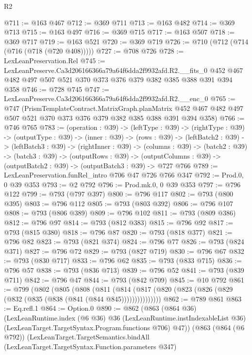 \begin{lexlean}{R2}
\begin{coremodule}
@711 := @163 @467
@712 := @369 @711
@713 := @163 @482
@714 := @369 @713
@715 := @163 @497
@716 := @369 @715
@717 := @163 @507
@718 := @369 @717
@719 := @163 @521
@720 := @369 @719
@726 := @710 (@712 (@714 (@716 (@718 (@720 @408)))))
@727 := @708 @726
@728 := LexLeanPreservation.Rel
@745 := LexLeanPreserve.Ca3d206166366a79a64f6dda2f9932afd.R2.__fits_0
    @452
    @467
    @482
    @497
    @507
    @521
    @370
    @373
    @376
    @379
    @382
    @385
    @388
    @391
    @394
    @358
@746 := @728 @745
@747 := LexLeanPreserve.Ca3d206166366a79a64f6dda2f9932afd.R2.__enc_0
@765 := @747
    (PrismTemplateContract.MatrixGraph.planMatrix
      @452
      @467
      @482
      @497
      @507
      @521
      @370
      @373
      @376
      @379
      @382
      @385
      @388
      @391
      @394
      @358)
@766 := @746 @765
@783 := (operation : @39) ->
  (leftType : @39) ->
  (rightType : @39) ->
  (outputType : @39) ->
  (inner : @39) ->
  (rows : @39) ->
  (leftBatch2 : @39) ->
  (leftBatch3 : @39) ->
  (rightInner : @39) ->
  (columns : @39) ->
  (batch2 : @39) ->
  (batch3 : @39) ->
  (outputRows : @39) ->
  (outputColumns : @39) -> (outputBatch2 : @39) -> (outputBatch3 : @39) -> @727 @766
@789 := LexLeanPreservation.funRel_intro @706 @47 @726 @766 @347
@792 := Prod.{0, 0} @39 @353
@793 := @2 @792
@796 := Prod.mk.{0, 0} @39 @353
@797 := @796 @122
@799 := @793 (@797 @397)
@800 := @796 @117
@802 := @793 (@800 @395)
@803 := @796 @112
@805 := @793 (@803 @392)
@806 := @796 @107
@808 := @793 (@806 @389)
@809 := @796 @102
@811 := @793 (@809 @386)
@812 := @796 @97
@814 := @793 (@812 @383)
@815 := @796 @92
@817 := @793 (@815 @380)
@818 := @796 @87
@820 := @793 (@818 @377)
@821 := @796 @82
@823 := @793 (@821 @374)
@824 := @796 @77
@826 := @793 (@824 @371)
@827 := @796 @72
@829 := @793 (@827 @719)
@830 := @796 @67
@832 := @793 (@830 @717)
@833 := @796 @62
@835 := @793 (@833 @715)
@836 := @796 @57
@838 := @793 (@836 @713)
@839 := @796 @52
@841 := @793 (@839 @711)
@842 := @796 @47
@844 := @793 (@842 @709)
@845 := @10 @792
@861 := @799
    (@802
      (@805
        (@808
          (@811
            (@814 (@817 (@820 (@823 (@826 (@829 (@832 (@835 (@838 (@841 (@844 @845)))))))))))))))
@862 := @789 @861
@863 := Eq.refl.{1}
@864 := Option.{0}
@890 := @862
    (@863
      (@864 @36)
      (LexLeanRuntime.index
        (@6 @36)
        @36
        (LexLeanRuntime.instIndexableList @36)
        (LexLeanTarget.TargetSyntax.Program.functions @706)
        @47))
    (@863
      (@864 (@6 @792))
      (LexLeanTarget.TargetSemantics.bindAll
        (LexLeanTarget.TargetSyntax.Function.parameters @347)

\end{coremodule}
\end{lexlean}
